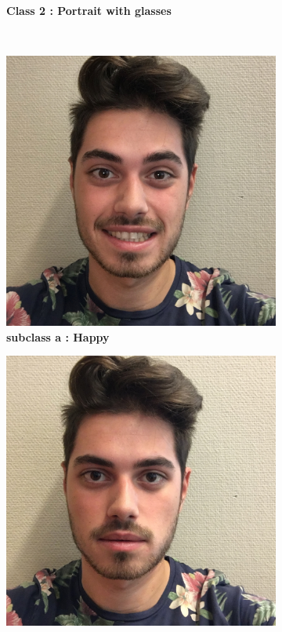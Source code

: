 \begin{figure}[!hp]
\begin{subfigure}[h]{0.45\textwidth}
	\caption{\bf Class 2 : Portrait with glasses}
	\label{fig:figure1_2}
    \end{subfigure} \\
    \begin{subfigure}[h]{0.30\textwidth}
    \centering
	\includegraphics[height=0.12\textheight]{dataset/IMG_1012.jpg}
	\caption{\bf subclass a : Happy}
    \label{fig:figure1_3}
	\end{subfigure}
    \begin{subfigure}[h]{0.30\textwidth}
    \centering
    \includegraphics[height=0.12\textheight]{dataset/IMG_0997.jpg}

\end{subfigure}
\end{figure}
